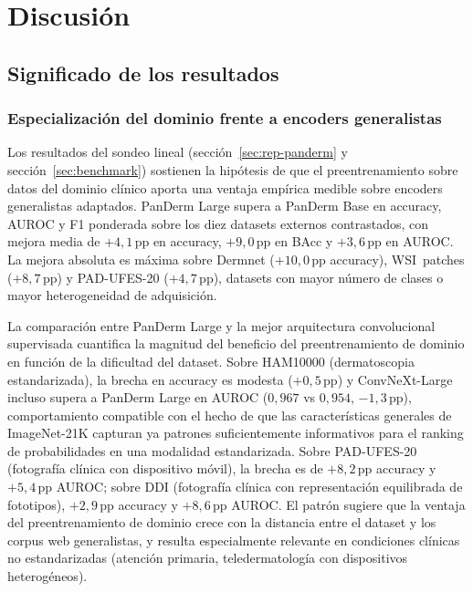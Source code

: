 
\chapter{Discusión}
\label{cap:discusion}

\section{Significado de los resultados}
\label{sec:significado}

\subsection{Especialización del dominio frente a encoders generalistas}
\label{sec:disc-especializacion}

Los resultados del sondeo lineal (secci\'on~\ref{sec:rep-panderm} y
secci\'on~\ref{sec:benchmark}) sostienen la hipótesis de que el
preentrenamiento sobre datos del dominio clínico aporta una ventaja
empírica medible sobre encoders generalistas adaptados. PanDerm
Large supera a PanDerm Base en accuracy, AUROC y F1 ponderada sobre
los diez datasets externos contrastados, con mejora media de
$+4{,}1$\,pp en accuracy, $+9{,}0$\,pp en BAcc y
$+3{,}6$\,pp en AUROC. La mejora absoluta es máxima sobre
Dermnet ($+10{,}0$\,pp accuracy), WSI~patches
($+8{,}7$\,pp) y PAD-UFES-20 ($+4{,}7$\,pp), datasets con
mayor número de clases o mayor heterogeneidad de adquisición.

La comparación entre PanDerm Large y la mejor arquitectura
convolucional supervisada cuantifica la magnitud del beneficio del
preentrenamiento de dominio en función de la dificultad del
dataset. Sobre HAM10000 (dermatoscopia estandarizada), la brecha
en accuracy es modesta ($+0{,}5$\,pp) y ConvNeXt-Large incluso
supera a PanDerm Large en AUROC ($0{,}967$ vs $0{,}954$,
$-1{,}3$\,pp), comportamiento compatible con el hecho de que
las características generales de ImageNet-21K capturan ya patrones
suficientemente informativos para el ranking de probabilidades en
una modalidad estandarizada. Sobre PAD-UFES-20 (fotografía clínica
con dispositivo móvil), la brecha es de $+8{,}2$\,pp accuracy y
$+5{,}4$\,pp AUROC; sobre DDI (fotografía clínica con
representación equilibrada de fototipos), $+2{,}9$\,pp accuracy
y $+8{,}6$\,pp AUROC. El patrón sugiere que la ventaja del
preentrenamiento de dominio crece con la distancia entre el dataset
y los corpus web generalistas, y resulta especialmente relevante en
condiciones clínicas no estandarizadas (atención primaria,
teledermatología con dispositivos heterogéneos).

